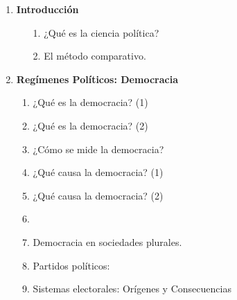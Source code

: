 \documentclass[letterpaper]{article}
\begin{document}
\begin{enumerate}
		\item {\bf Introducci\'on}
			\begin{enumerate}
				\item[1.] ¿Qu\'e es la ciencia pol\'itica? %
				\item[2.] El m\'etodo comparativo. %
			\end{enumerate}
		\item {\bf Reg\'imenes Pol\'iticos: Democracia}
			\begin{enumerate}
				\item ¿Qu\'e es la democracia? (1) %
				\item ¿Qu\'e es la democracia? (2) %
				\item ¿C\'omo se mide la democracia? %
				\item ¿Qu\'e causa la democracia? (1) %
				\item ¿Qu\'e causa la democracia? (2)  %
				\item 
				\item Democracia en sociedades plurales. %
				\item Partidos pol\'iticos: %
				\item Sistemas electorales: Or\'igenes y Consecuencias %

\end{enumerate}
\end{enumerate}
\end{document}
